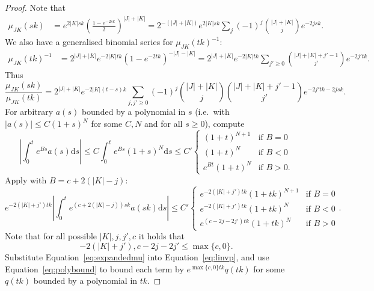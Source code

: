 \documentclass{article}
\newcommand{\di}{\mathrm{d}}
\newcommand{\inv}{^{-1}}
\theoremstyle{definition}
\theoremstyle{remark}
\begin{document}
\begin{proof}
    Note that
    \begin{align*}
        \mu_{JK}(sk) &= e^{2|K|sk} \left(\frac{1 - e^{-2sk}}{2}\right)^{|J|+|K|} =  2^{-(|J|+|K|)} e^{2|K|sk} \sum_j (-1)^j \binom{|J|+|K|}{j} e^{-2jsk}.
    \end{align*}
    We also have a generalised binomial series for $\mu_{JK}(tk)\inv$:
    \begin{align*}
        \mu_{JK}(tk)\inv &= 2^{|J|+|K|} e^{-2|K|tk} (1-e^{-2tk})^{-|J|-|K|}= 2^{|J|+|K|} e^{-2|K|tk} \sum_{j' \ge 0} \binom{|J|+|K|+j'-1}{j'} e^{-2j'tk}.
    \end{align*}
    Thus
    \begin{equation}
        \label{eq:expandedmu}
        \frac{\mu_{JK}(sk)}{\mu_{JK}(tk)} = 2^{|J|+|K|} e^{-2|K|(t-s)k} \sum_{j, j' \ge 0}(-1)^j  \binom{|J|+|K|}{j} \binom{|J|+|K|+j'-1}{j'} e^{-2j'tk-2jsk}.
    \end{equation}
    For arbitrary $a(s)$ bounded by a polynomial in $s$ (i.e.\ with $|a(s)| \le C (1+s)^N$ for some $C,N$ and for all $s \ge 0$), compute
    \[
        \left|\int_0^t e^{Bs} a(s) \di s\right| \le C\int_0^t e^{Bs} (1+s)^N \di s \le C'\begin{cases}(1+t)^{N+1} & \text{if $B = 0$} \\ (1+t)^N & \text{if $B < 0$} \\ e^{Bt} (1+t)^N & \text{if $B > 0$}. \end{cases}
    \]
    Apply with $B = c+2(|K|-j)$:
    \begin{equation}
        \label{eq:polybound}
        e^{-2(|K|+j')tk} \left|\int_0^t e^{(c+2(|K|-j))sk} a(sk) \di s\right| \le C'\begin{cases} e^{-2(|K|+j')tk} (1+tk)^{N+1} &\text{if $B = 0$} \\ e^{-2(|K|+j')tk} (1+tk)^{N} &\text{if $B < 0$} \\ e^{(c-2j-2j')tk} (1+tk)^N & \text{if $B>0$} \end{cases}.
    \end{equation}
    Note that for all possible $|K|, j, j', c$ it holds that
    \[
        -2(|K|+j'),c-2j-2j' \le \max\{c,0\}.
    \]
    Substitute Equation~\eqref{eq:expandedmu} into Equation~\eqref{eq:linvp}, and use Equation~\eqref{eq:polybound} to bound each term by $e^{\max\{c,0\}tk} q(tk)$ for some $q(tk)$ bounded by a polynomial in $tk$.
\end{proof}
\end{document}
